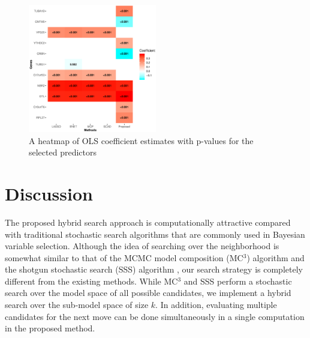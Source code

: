 \documentclass[twocolumn]{svjour3}       %
\newcommand{\0}{\boldsymbol 0} %
\newcommand{\1}{\boldsymbol 1} %
\begin{document}
{%
\begin{figure}
\includegraphics[width=0.5\textwidth]{Heatmap.eps}
\caption{A heatmap of OLS coefficient estimates with p-values for the selected predictors}
\label{Fig:heatmap}       %
\end{figure}

%
%
\section{Discussion}
The proposed hybrid search approach is computationally attractive compared with traditional stochastic search algorithms that are commonly used in Bayesian variable selection. Although the idea of searching over the neighborhood is somewhat similar to that of the MCMC model composition (MC$^3$) algorithm \cite{madigan1995bayesian} and the shotgun stochastic search (SSS) algorithm \cite{hans2007shotgun}, our search strategy is completely different from the existing methods. While MC$^3$ and SSS perform a stochastic search over the model space of all possible candidates, we implement a hybrid search over the sub-model space of size $k$. In addition, evaluating multiple candidates for the next move can be done simultaneously in a single computation in the proposed method.

}
\end{document}
